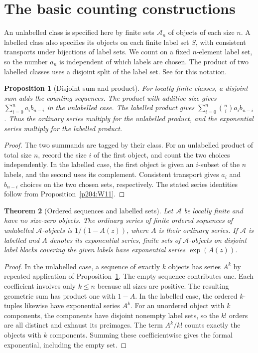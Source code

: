 \documentclass[11pt,oneside,openany]{book}
\theoremstyle{plain}
\newtheorem{theorem}{Theorem}[chapter]
\newtheorem{proposition}[theorem]{Proposition}
\theoremstyle{definition}
\theoremstyle{remark}
\begin{document}
\section{The basic counting constructions}

An unlabelled class is specified here by finite sets \(\mathcal A_n\)
of objects of each size \(n\). A labelled class also specifies its
objects on each finite label set \(S\), with consistent transports
under bijections of label sets. We count on a fixed \(n\)-element
label set, so the number \(a_n\) is independent of which labels are
chosen. The product of two labelled classes uses a disjoint split
of the label set. See \cite[Chapters I and II]{FS} for this notation.

\begin{proposition}[Disjoint sum and product]\label{p204:W19}
For locally finite classes, a disjoint sum adds the counting sequences.
The product with additive size gives
\(\sum_{i=0}^n a_i b_{n-i}\) in the unlabelled case.
The labelled product gives
\(\sum_{i=0}^n\binom ni a_i b_{n-i}\).
Thus the ordinary series multiply for the unlabelled product, and
the exponential series multiply for the labelled product.
\end{proposition}
\begin{proof}
The two summands are tagged by their class. For an unlabelled
product of total size \(n\), record the size \(i\) of the first
object, and count the two choices independently. In the labelled
case, the first object is given an \(i\)-subset of the \(n\) labels,
and the second uses its complement. Consistent transport gives
\(a_i\) and \(b_{n-i}\) choices on the two chosen sets, respectively.
The stated series identities follow from
Proposition~\ref{p204:W11}.
\end{proof}

\begin{theorem}[Ordered sequences and labelled sets]\label{p204:W20}
Let \(\mathcal A\) be locally finite and have no size-zero objects.
The ordinary series of finite ordered sequences of unlabelled
\(\mathcal A\)-objects is \(1/(1-A(z))\), where \(A\) is their
ordinary series. If \(\mathcal A\) is labelled and \(A\) denotes
its exponential series, finite sets of \(\mathcal A\)-objects on
disjoint label blocks covering the given labels have exponential
series \(\exp(A(z))\).
\end{theorem}
\begin{proof}
In the unlabelled case, a sequence of exactly \(k\) objects has
series \(A^k\) by repeated application of
Proposition~\ref{p204:W19}. The empty sequence contributes one.
Each coefficient involves only \(k\le n\) because all sizes
are positive. The resulting geometric sum has product one with
\(1-A\).
In the labelled case, the ordered \(k\)-tuples likewise have
exponential series \(A^k\). For an unordered object with \(k\)
components, the components have disjoint nonempty label sets,
so the \(k!\) orders are all distinct and exhaust its preimages.
The term \(A^k/k!\) counts exactly the objects with \(k\)
components. Summing these coefficientwise gives the formal
exponential, including the empty set.
\end{proof}
\end{document}
